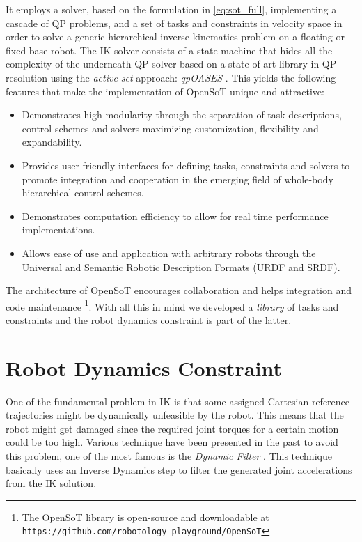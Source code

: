 It employs a solver, based on the formulation in \eqref{eq:sot_full}, implementing a cascade of QP problems, and a set of tasks and constraints in velocity space in order to solve a generic hierarchical inverse kinematics problem on a floating or fixed base robot. The IK solver consists of a state machine that hides all the complexity of the underneath QP solver based on a state-of-art library in QP resolution using the \emph{active set} approach: \emph{qpOASES} \cite{ferreau2013}.
This yields the following features that make the implementation of OpenSoT unique and attractive:   
\begin{itemize}
\item Demonstrates high modularity through the separation of task descriptions, control schemes and solvers maximizing customization, flexibility and expandability.  
\item Provides user friendly interfaces for defining tasks, constraints and solvers to promote integration and cooperation in the emerging field of whole-body hierarchical control schemes.
\item Demonstrates computation efficiency to allow for real time performance implementations.
\item Allows ease of use and application with arbitrary robots through the Universal and Semantic Robotic Description Formats (URDF and SRDF).
\end{itemize}
The architecture of OpenSoT encourages collaboration and helps integration and code maintenance \footnote{The OpenSoT library is open-source and downloadable at\\ \texttt{https://github.com/robotology-playground/OpenSoT}}. With all this in mind we developed a \emph{library} of tasks and constraints and the robot dynamics constraint is part of the latter.

\section{Robot Dynamics Constraint}
\label{sec:robot_dynamic_constraint3}
One of the fundamental problem in IK is that some assigned Cartesian reference trajectories might be dynamically unfeasible by the robot. This means that the robot might get damaged since the required joint torques for a certain motion could be too high. Various technique have been presented in the past to avoid this problem, one of the most famous is the \emph{Dynamic Filter} \cite{Yamane:04}. This technique basically uses an Inverse Dynamics step to filter the generated joint accelerations from the IK solution. 

